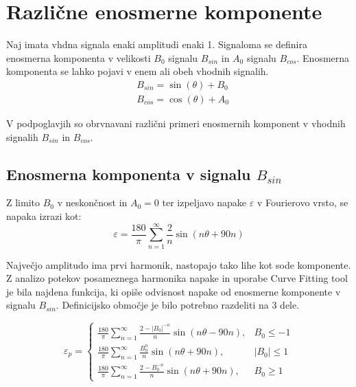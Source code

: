 \section{Različne enosmerne komponente}
Naj imata vhdna signala enaki amplitudi enaki 1. Signaloma se definira enosmerna komponenta v velikosti $B_0$ signalu $B_{sin}$ in $A_0$ signalu $B_{cos}$. Enosmerna komponenta se lahko pojavi v enem ali obeh vhodnih signalih.
\begin{eqnarray}
\label{equ:def_sin_ama}
&B_{sin} = \sin(\theta) + B_0\\
\label{equ:def_cos_amp}
&B_{cos} =\cos(\theta) +A_0
\end{eqnarray}

V podpoglavjih so obrvnavani različni primeri enosmernih komponent v vhodnih signalih $B_{sin}$ in $B_{cos}$.
\subsection{Enosmerna komponenta v signalu $B_{sin}$}

Z limito $B_0$ v neskončnost in $A_0 = 0$ ter izpeljavo napake $\varepsilon$ v Fourierovo vrsto, se napaka izrazi kot:
\begin{equation}
\varepsilon = \frac{180}{\pi}\sum_{n=1}^{\infty}\frac{2}{n} \sin (n \theta + 90 n)
\end{equation}

Največjo amplitudo ima prvi harmonik, nastopajo tako lihe kot sode komponente.
Z analizo potekov posameznega harmonika napake in uporabe Curve Fitting tool je bila najdena funkcija, ki opiše odvisnost napake od enosmerne komponente v signalu $B_{sin}$. Definicijsko območje je bilo potrebno
razdeliti na 3 dele.

\begin{equation}
\label{vrsta_sinoff}
\varepsilon_p=
\begin{cases}
\frac{180}{\pi}\sum_{n=1}^{\infty}\frac{2-|B_0|^{-n}}{n} \sin (n \theta -  90 n), & B_0\leq -1 \\
\frac{180}{\pi}\sum_{n=1}^{\infty}\frac{B_0^n}{n} \sin (n \theta + 90 n), & |B_0|\leq 1 \\
\frac{180}{\pi}\sum_{n=1}^{\infty}\frac{2-B_0^{-n}}{n} \sin (n \theta + 90 n), & B_0\geq 1
\end{cases}
\end{equation}

